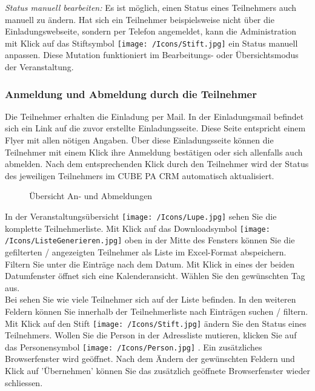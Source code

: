 \vspace{\baselineskip}

\textit{Status manuell bearbeiten:} Es ist möglich, einen Status eines Teilnehmers auch manuell zu ändern. Hat sich ein Teilnehmer beispielsweise nicht über die Einladungswebseite, sondern per Telefon angemeldet, kann die Administration mit Klick auf das Stiftsymbol \texttt{[image: /Icons/Stift.jpg]} ein Status manuell anpassen. Diese Mutation funktioniert im Bearbeitungs- oder Übersichtsmodus der Veranstaltung.

\subsubsection{Anmeldung und Abmeldung durch die Teilnehmer}

Die Teilnehmer erhalten die Einladung per Mail. In der Einladungsmail befindet sich ein Link auf die zuvor erstellte Einladungsseite. Diese Seite entspricht einem Flyer mit allen nötigen Angaben. Über diese Einladungsseite können die Teilnehmer mit einem Klick ihre Anmeldung bestätigen oder sich allenfalls auch abmelden. Nach dem entsprechenden Klick durch den Teilnehmer wird der Status des jeweiligen Teilnehmers im CUBE PA CRM automatisch aktualisiert. 

\begin{figure}[H]
\caption{Übersicht An- und Abmeldungen}
\end{figure}

In der Veranstaltungsübersicht \texttt{[image: /Icons/Lupe.jpg]} sehen Sie die komplette Teilnehmerliste. Mit Klick auf das Downloadsymbol \texttt{[image: /Icons/ListeGenerieren.jpg]} oben in der Mitte des Fensters können Sie die gefilterten / angezeigten Teilnehmer als Liste im Excel-Format abspeichern. Filtern Sie unter  die Einträge nach dem Datum. Mit Klick in eines der beiden Datumfenster öffnet sich eine Kalenderansicht. Wählen Sie den gewünschten Tag aus. \\
Bei  sehen Sie wie viele Teilnehmer sich auf der Liste befinden. In den weiteren Feldern  können Sie innerhalb der Teilnehmerliste nach Einträgen suchen / filtern. Mit Klick auf den Stift \texttt{[image: /Icons/Stift.jpg]}  ändern Sie den Status eines Teilnehmers. Wollen Sie die Person in der Adressliste mutieren, klicken Sie auf das Personensymbol \texttt{[image: /Icons/Person.jpg]} . Ein zusätzliches Browserfenster wird geöffnet. Nach dem Ändern der gewünschten Feldern und Klick auf 'Übernehmen' können Sie das zusätzlich geöffnete Browserfenster wieder schliessen. 

